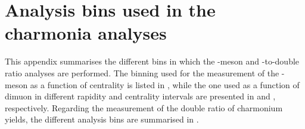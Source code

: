 \chapter{Analysis bins used in the charmonia analyses}\label{app:Charmonia_Binning}

This appendix summarises the different bins in which the \JPsi-meson \raa and \PsiP-to-\JPsi double ratio analyses are performed. The binning used for the measurement of the \JPsi-meson \raa as a function of centrality is listed in , while the one used as a function of dimuon \pt in different rapidity and centrality intervals are presented in  and , respectively. Regarding the measurement of the double ratio of charmonium yields, the different analysis bins are summarised in .

